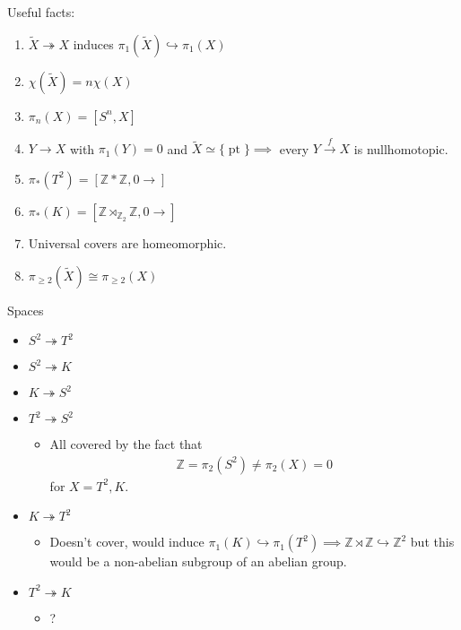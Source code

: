 \begin{solution}

Useful facts:

\begin{enumerate}
\def\labelenumi{\arabic{enumi}.}
\tightlist
\item
  \(\tilde X \twoheadrightarrow X\) induces
  \(\pi_1(\tilde X) \hookrightarrow\pi_1(X)\)
\item
  \(\chi(\tilde X) = n \chi (X)\)
\item
  \(\pi_n(X) = [S^n, X]\)
\item
  \(Y \to X\) with \(\pi_1(Y) = 0\) and
  \(\tilde X \simeq{\{\operatorname{pt}\}}\implies\) every
  \(Y\xrightarrow{f} X\) is nullhomotopic.
\item
  \(\pi_*(T^2) = [{\mathbb{Z}}\ast {\mathbb{Z}}, 0\rightarrow]\)
\item
  \(\pi_*(K) = [{\mathbb{Z}}\rtimes_{{\mathbb{Z}}_2} {\mathbb{Z}}, 0\rightarrow]\)
\item
  Universal covers are homeomorphic.
\item
  \(\pi_{\geq 2}(\tilde X) \cong \pi_{\geq 2}(X)\)
\end{enumerate}

Spaces

\begin{itemize}
\tightlist
\item
  \(S^2 \twoheadrightarrow T^2\)
\item
  \(S^2 \twoheadrightarrow K\)
\item
  \(K \twoheadrightarrow S^2\)
\item
  \(T^2 \twoheadrightarrow S^2\)

  \begin{itemize}
  \tightlist
  \item
    All covered by the fact that
    \begin{align*}
      {\mathbb{Z}}= \pi_2(S^2) \neq \pi_2(X) = 0
      \end{align*}
    for \(X = T^2, K\).
  \end{itemize}
\item
  \(K \twoheadrightarrow T^2\)

  \begin{itemize}
  \tightlist
  \item
    Doesn't cover, would induce
    \(\pi_1(K) \hookrightarrow\pi_1(T^2) \implies {\mathbb{Z}}\rtimes{\mathbb{Z}}\hookrightarrow{\mathbb{Z}}^2\)
    but this would be a non-abelian subgroup of an abelian group.
  \end{itemize}
\item
  \(T^2 \twoheadrightarrow K\)

  \begin{itemize}
  \tightlist
  \item
    ?
  \end{itemize}
\end{itemize}

\end{solution}

